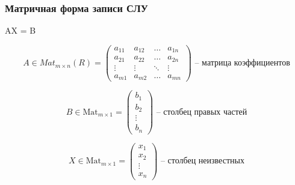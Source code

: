 \subsubsection*{Матричная форма записи СЛУ}

\begin{math*}
    AX = B
\end{math*}

\begin{equation*}
    A \in Mat_{m \times n}(R) = \begin{pmatrix}
        a_{11} & a_{12} & \dots & a_{1n} \\
        a_{21} & a_{22} & \dots & a_{2n} \\
        \vdots & \vdots & \ddots & \vdots \\
        a_{m1} & a_{m2} & \dots & a_{mn}
    \end{pmatrix} \text{ -- матрица коэффициентов}
\end{equation*}

\begin{equation*}
    B \in \text{Mat}_{m \times 1} = \begin{pmatrix}
        b_1 \\ b_2 \\ \vdots \\ b_n
    \end{pmatrix} \text{ -- столбец правых частей}
\end{equation*}

\begin{equation*}
    X \in \text{Mat}_{m \times 1} = \begin{pmatrix}
        x_1 \\ x_2 \\ \vdots \\ x_n
    \end{pmatrix} \text{ -- столбец неизвестных}
\end{equation*} 
